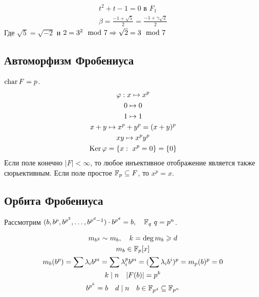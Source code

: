 
\begin{problem}
  \begin{gather}
    t^2 + t - 1 = 0 \text{ в $F_1$} \\
    \beta = \frac{-1 + \sqrt{5}}{2} = \frac{-1 + \gamma \sqrt{2}}{2}
  \end{gather}
  Где $\sqrt{5} = \sqrt{-2}$ и $2 = 3^2 \mod 7 \Rightarrow \sqrt{2} = 3 \mod 7$
\end{problem}

\subsection{Автоморфизм Фробениуса}

\begin{definition}
  $\operatorname{char} F = p$.
  \begin{gather}
    \varphi: x \mapsto x^p \\
    0 \mapsto 0 \\
    1 \mapsto 1 \\
    x + y \mapsto x^p + y^p = (x + y)^p \\
    xy \mapsto x^p y^p \\
    \operatorname{Ker} \varphi = \{x: \ x^p = 0 \} =\{0 \}
  \end{gather}
  Если поле конечно $|F| < \infty$, то любое инъективное отображение является также сюрьективным.
  Если поле простое $\mathbb{F}_p \subseteq F$, то $x^p = x$.
\end{definition}

\subsection{Орбита Фробениуса}

Рассмотрим $(b, b^p, b^{p^2}, \dots, b^{p^d - 1}) \cdot b^{p^d} = b, \quad \mathbb{F}_q \ q = p^n$.

\begin{gather}
  m_{b^2} \sim m_b, \quad k = \deg m_b \geqslant d \\
  m_b \in \mathbb{F}_p[x] \\
  m_b (b^p) = \sum \lambda_i b^{pi} = \sum \lambda_i^p b^{pi} = (\sum \lambda_i b^i)^p = m_p(b)^p = 0
  \\
  k \mid n \quad |F(b)| = p^k \\
  b^{p^k} = b \quad d \mid n \quad b \in \mathbb{F}_{p^d} \subseteq \mathbb{F}_{p^n}
\end{gather}

